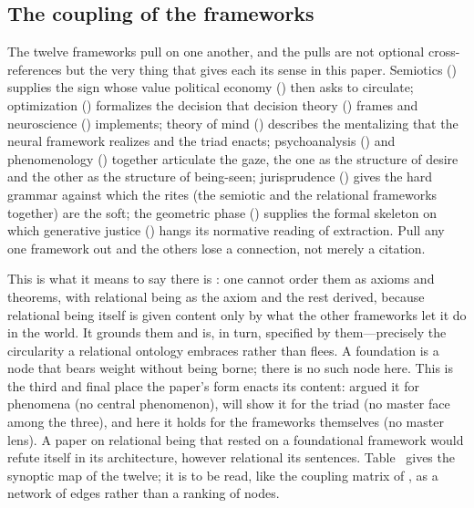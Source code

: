 \subsection{The coupling of the frameworks}
The twelve frameworks pull on one another, and the pulls are not optional cross-references but the very thing that gives each its sense in this paper. Semiotics () supplies the sign whose value political economy () then asks to circulate; optimization () formalizes the decision that decision theory () frames and neuroscience () implements; theory of mind () describes the mentalizing that the neural framework realizes and the triad enacts; psychoanalysis () and phenomenology () together articulate the gaze, the one as the structure of desire and the other as the structure of being-seen; jurisprudence () gives the hard grammar against which the rites (the semiotic and the relational frameworks together) are the soft; the geometric phase () supplies the formal skeleton on which generative justice () hangs its normative reading of extraction. Pull any one framework out and the others lose a connection, not merely a citation.

This is what it means to say there is : one cannot order them as axioms and theorems, with relational being as the axiom and the rest derived, because relational being itself is given content only by what the other frameworks let it do in the world. It grounds them and is, in turn, specified by them---precisely the circularity a relational ontology embraces rather than flees. A foundation is a node that bears weight without being borne; there is no such node here. This is the third and final place the paper's form enacts its content:  argued it for phenomena (no central phenomenon),  will show it for the triad (no master face among the three), and here it holds for the frameworks themselves (no master lens). A paper on relational being that rested on a foundational framework would refute itself in its architecture, however relational its sentences. Table~ gives the synoptic map of the twelve; it is to be read, like the coupling matrix of , as a network of edges rather than a ranking of nodes.

